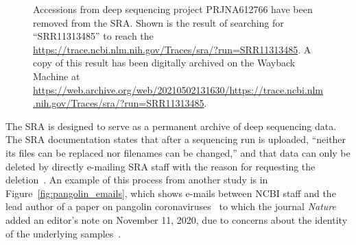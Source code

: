 \documentclass[9pt,twocolumn,twoside]{gsajnl_modified}
\begin{document}
\begin{figure}[]
\centering
{}
\caption{Accessions from deep sequencing project PRJNA612766 have been removed from the SRA.
Shown is the result of searching for ``SRR11313485'' to reach the \url{https://trace.ncbi.nlm.nih.gov/Traces/sra/?run=SRR11313485}.
A copy of this result has been digitally archived on the Wayback Machine at \url{https://web.archive.org/web/20210502131630/https://trace.ncbi.nlm.nih.gov/Traces/sra/?run=SRR11313485}.
}%
\label{fig:acc_removed}
\end{figure}

The SRA is designed to serve as a permanent archive of deep sequencing data.
The SRA documentation states that after a sequencing run is uploaded, ``neither its files can be replaced nor filenames can be changed,'' and that data can only be deleted by directly e-mailing SRA staff with the reason for requesting the deletion~\citep{SRA_deletion}.
An example of this process from another study is in Figure~\ref{fig:pangolin_emails}, which shows e-mails between NCBI staff and the lead author of a paper on pangolin coronaviruses~\citep{xiao2020isolation} to which the journal \textit{Nature} added an editor's note on November 11, 2020, due to concerns about the identity of the underlying samples~\citep{chan2020single}.
\end{document}
